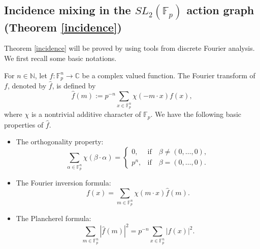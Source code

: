\documentclass[11pt]{article}
\def\Fbb{\mathbb{F}}
\def\Cbb{\mathbb{C}}
\def\Nbb{\mathbb{N}}
\def\lv{\left\vert}
\def\rv{\right\vert}
\def\rar{\rightarrow}
\begin{document}

\subsection{Incidence mixing in the $SL_2(\mathbb{F}_p)$ action graph (Theorem \ref{incidence})}

Theorem \ref{incidence} will be proved by using tools from discrete Fourier analysis. We first recall some basic notations.

For $n\in \Nbb$, let $f:\Fbb_p^n \rar \Cbb$ be a complex valued function. The Fourier transform of $f$, denoted by $\widehat{f}$, is defined by
\[\widehat{f}(m):=p^{-n}\sum_{x\in\Fbb_p^n} \chi (-m\cdot x)f(x),\]
where $\chi$ is a nontrivial additive character of $\Fbb_p$. We
have the following basic properties of $\widehat{f}$.
\begin{itemize}
    \item The orthogonality property:
\[ \sum_{\alpha \in \Fbb_p^n}\chi (\beta \cdot \alpha) =\begin{cases}
    0 ,& \text{if}\quad \beta \ne (0,\ldots ,0) ,\\
    p^n ,& \text{if}\quad \beta = (0,\ldots ,0) .
\end{cases}\]
\item The Fourier inversion formula:
    \[ f(x)= \sum_{m\in \Fbb_p^n}\chi (m\cdot x) \widehat{f}(m). \]
\item The Plancherel formula:
    \[ \sum_{m\in \Fbb_p^n} \lv \widehat{f} (m)\rv^2 =p^{-n} \sum_{x\in \Fbb_p^n} \lv f(x) \rv^2. \]
\end{itemize}
\end{document}
